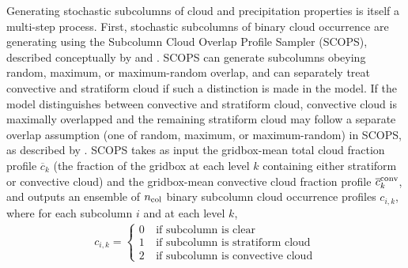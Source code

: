 Generating stochastic subcolumns of cloud and precipitation properties is itself a multi-step process. First, stochastic subcolumns of binary cloud occurrence are generating using the Subcolumn Cloud Overlap Profile Sampler (SCOPS), described conceptually by \cite{klein_and_jakob_1999} and \cite{webb_et_al_2001}. SCOPS can generate subcolumns obeying random, maximum, or maximum-random overlap, and can separately treat convective and stratiform cloud if such a distinction is made in the model. If the model distinguishes between convective and stratiform cloud, convective cloud is maximally overlapped and the remaining stratiform cloud may follow a separate overlap assumption (one of random, maximum, or maximum-random) in SCOPS, as described by \cite{webb_et_al_2001}. SCOPS takes as input the gridbox-mean total cloud fraction profile $\overline{c}_k$ (the fraction of the gridbox at each level $k$ containing either stratiform or convective cloud) and the gridbox-mean convective cloud fraction profile $\overline{c}^{\rm conv}_k$, and outputs an ensemble of $n_{\rm col}$ binary subcolumn cloud occurrence profiles $c_{i, k}$, where for each subcolumn $i$ and at each level $k$,
\begin{gather}
    c_{i, k} = \begin{cases}
         0 & ~\text{if subcolumn is clear} \\
         1 & ~\text{if subcolumn is stratiform cloud} \\
         2 & ~\text{if subcolumn is convective cloud}
    \end{cases}
\end{gather}

